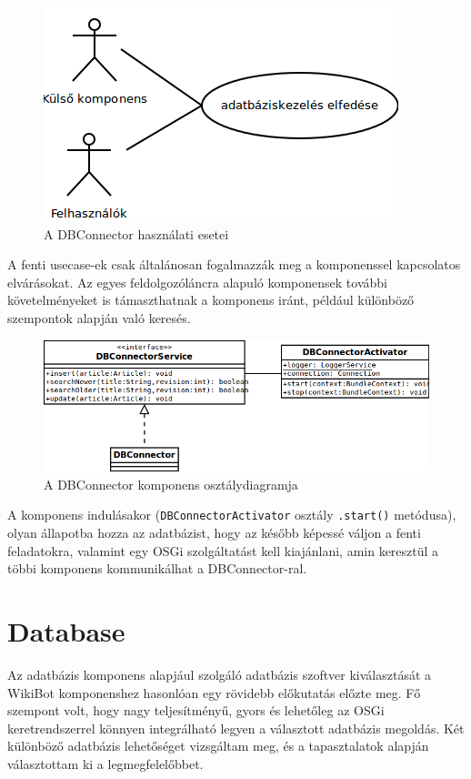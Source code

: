 \begin{figure}[htp]
\centering
\includegraphics[scale=0.5]{img/usecase_dbconnector}
\caption{A DBConnector használati esetei}
\label{fig:usecase_dbconnector}
\end{figure}

A fenti usecase-ek csak általánosan fogalmazzák meg a komponenssel kapcsolatos elvárásokat. Az egyes feldolgozóláncra alapuló komponensek további követelményeket is támaszthatnak a komponens iránt, például különböző szempontok alapján való keresés.

\begin{figure}[htp]
\centering
\includegraphics[scale=0.5]{img/class_dbconnector}
\caption{A DBConnector komponens osztálydiagramja}
\label{fig:}
\end{figure}

A komponens indulásakor (\texttt{DBConnectorActivator} osztály \texttt{.start()} metódusa), olyan állapotba hozza az adatbázist, hogy az később képessé váljon a fenti feladatokra, valamint egy OSGi szolgáltatást kell kiajánlani, amin keresztül a többi komponens kommunikálhat a DBConnector-ral.


\section{Database}
\label{sec:db}

Az adatbázis komponens alapjául szolgáló adatbázis szoftver kiválasztását a WikiBot komponenshez hasonlóan egy rövidebb előkutatás előzte meg. Fő szempont volt, hogy nagy teljesítményű, gyors és lehetőleg az OSGi keretrendszerrel könnyen integrálható legyen a választott adatbázis megoldás. Két különböző adatbázis lehetőséget vizsgáltam meg, és a tapasztalatok alapján választottam ki a legmegfelelőbbet.

